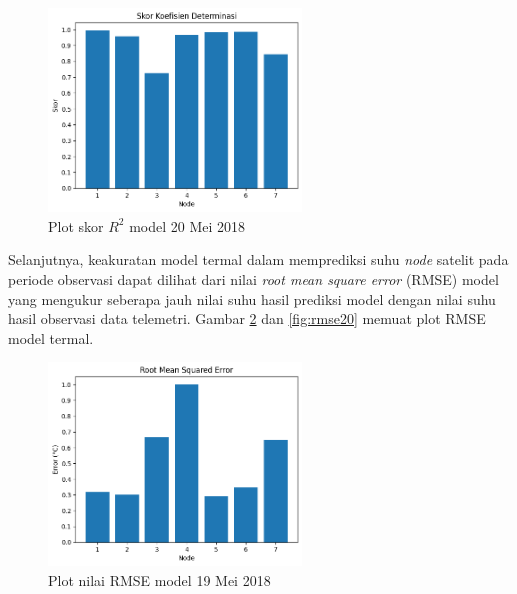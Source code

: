 \begin{figure}[H]
\setlength{}
\begin{center}
\includegraphics[width=0.6\textwidth]{fig/r2_2018-05-20.png}
\caption{Plot skor $R^2$ model 20 Mei 2018}
\label{fig:r220}
\end{center}
\end{figure}

Selanjutnya, keakuratan model termal dalam memprediksi suhu \textit{node} satelit pada
periode observasi dapat dilihat dari nilai \textit{root mean square error} (RMSE)
model yang mengukur seberapa jauh nilai suhu hasil prediksi model dengan nilai
suhu hasil observasi data telemetri. Gambar \ref{fig:rmse19} dan
\ref{fig:rmse20} memuat plot RMSE model termal. 

\begin{figure}[H]
\setlength{}
\begin{center}
\includegraphics[width=0.6\textwidth]{fig/rmse_2018-05-19.png}
\caption{Plot nilai RMSE model 19 Mei 2018}
\label{fig:rmse19}
\end{center}
\end{figure}

